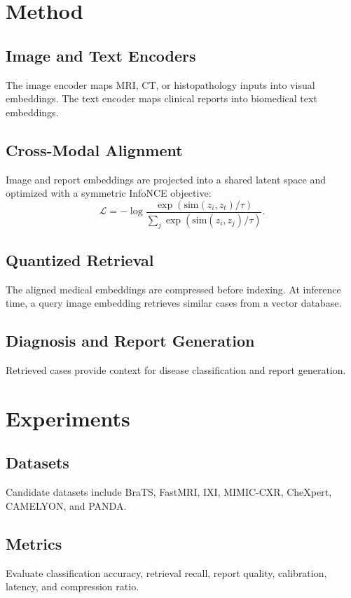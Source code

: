 \documentclass[conference]{IEEEtran}
\begin{document}
\section{Method}
\subsection{Image and Text Encoders}
The image encoder maps MRI, CT, or histopathology inputs into visual embeddings. The text encoder maps clinical reports into biomedical text embeddings.

\subsection{Cross-Modal Alignment}
Image and report embeddings are projected into a shared latent space and optimized with a symmetric InfoNCE objective:
\begin{equation}
\mathcal{L} =
- \log
\frac{
\exp(\mathrm{sim}(z_i, z_t) / \tau)
}{
\sum_j \exp(\mathrm{sim}(z_i, z_j) / \tau)
}.
\end{equation}

\subsection{Quantized Retrieval}
The aligned medical embeddings are compressed before indexing. At inference time, a query image embedding retrieves similar cases from a vector database.

\subsection{Diagnosis and Report Generation}
Retrieved cases provide context for disease classification and report generation.

\section{Experiments}
\subsection{Datasets}
Candidate datasets include BraTS, FastMRI, IXI, MIMIC-CXR, CheXpert, CAMELYON, and PANDA.

\subsection{Metrics}
Evaluate classification accuracy, retrieval recall, report quality, calibration, latency, and compression ratio.
\end{document}
